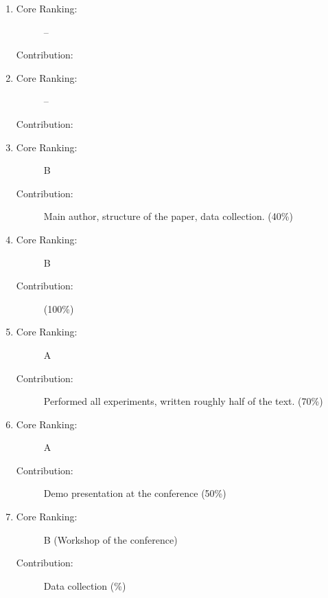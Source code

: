 \begin{enumerate}
  \item {} 
  \begin{description}
    \item[Core Ranking:] --
    \item[Contribution:] 
  \end{description}
  
  \item {}
  \begin{description}
    \item[Core Ranking:] --
    \item[Contribution:] 
  \end{description}
  
  \item {}
  \begin{description}
    \item[Core Ranking:] B
    \item[Contribution:] Main author, structure of the paper, data collection. (40\%)
  \end{description}
  
  \item {}
  \begin{description}
    \item[Core Ranking:] B
    \item[Contribution:] (100\%)
  \end{description}  
  
  \item {}
  \begin{description}
    \item[Core Ranking:] A
    \item[Contribution:] Performed all experiments, written roughly half of the text. (70\%)
  \end{description}
  
  \item {}
  \begin{description}
    \item[Core Ranking:] A
    \item[Contribution:] Demo presentation at the conference (50\%)
  \end{description}
  
  \item {}
  \begin{description}
    \item[Core Ranking:] B (Workshop of the conference)
    \item[Contribution:] Data collection (\%)
  \end{description}
  

\end{enumerate}
